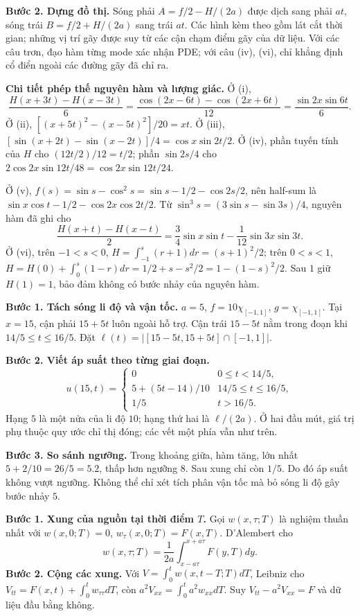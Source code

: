 \textbf{Bước 2. Dựng đồ thị.} Sóng phải $A=f/2-H/(2a)$ được dịch sang phải $at$, sóng trái $B=f/2+H/(2a)$ sang trái $at$. Các hình kèm theo gồm lát cắt thời gian; những vị trí gãy được suy từ các cận chạm điểm gãy của dữ liệu. Với các câu trơn, đạo hàm từng mode xác nhận PDE; với câu (iv), (vi), chỉ khẳng định cổ điển ngoài các đường gãy đã chỉ ra.

\textbf{Chi tiết phép thế nguyên hàm và lượng giác.} Ở (i),
\[\frac{H(x+3t)-H(x-3t)}6
=\frac{\cos(2x-6t)-\cos(2x+6t)}{12}
=\frac{\sin2x\sin6t}{6}.\]
Ở (ii), $[(x+5t)^2-(x-5t)^2]/20=xt$. Ở (iii), $[\sin(x+2t)-\sin(x-2t)]/4=\cos x\sin2t/2$. Ở (iv), phần tuyến tính của $H$ cho $(12t/2)/12=t/2$; phần $\sin2s/4$ cho $2\cos2x\sin12t/48=\cos2x\sin12t/24$.

Ở (v), $f(s)=\sin s-\cos^2s=\sin s-1/2-\cos2s/2$, nên half-sum là $\sin x\cos t-1/2-\cos2x\cos2t/2$. Từ $\sin^3s=(3\sin s-\sin3s)/4$, nguyên hàm đã ghi cho
\[\frac{H(x+t)-H(x-t)}2=\frac34\sin x\sin t-\frac1{12}\sin3x\sin3t.\]
Ở (vi), trên $-1<s<0$, $H=\int_{-1}^s(r+1)dr=(s+1)^2/2$; trên $0<s<1$, $H=H(0)+\int_0^s(1-r)dr=1/2+s-s^2/2=1-(1-s)^2/2$. Sau $1$ giữ $H(1)=1$, bảo đảm không có bước nhảy của nguyên hàm.

\textbf{Bước 1. Tách sóng li độ và vận tốc.} $a=5$, $f=10\chi_{[-1,1]}$, $g=\chi_{[-1,1]}$. Tại $x=15$, cận phải $15+5t$ luôn ngoài hỗ trợ. Cận trái $15-5t$ nằm trong đoạn khi $14/5\le t\le16/5$. Đặt $\ell(t)=|[15-5t,15+5t]\cap[-1,1]|$.

\textbf{Bước 2. Viết áp suất theo từng giai đoạn.}
\[u(15,t)=\begin{cases}0&0\le t<14/5,\\5+(5t-14)/10&14/5\le t\le16/5,\\1/5&t>16/5.\end{cases}\]
Hạng $5$ là một nửa của li độ $10$; hạng thứ hai là $\ell/(2a)$. Ở hai đầu mút, giá trị phụ thuộc quy ước chỉ thị đóng; các vết một phía vẫn như trên.

\textbf{Bước 3. So sánh ngưỡng.} Trong khoảng giữa, hàm tăng, lớn nhất $5+2/10=26/5=5.2$, thấp hơn ngưỡng $8$. Sau xung chỉ còn $1/5$. Do đó áp suất không vượt ngưỡng. Không thể chỉ xét tích phân vận tốc mà bỏ sóng li độ gây bước nhảy $5$.

\textbf{Bước 1. Xung của nguồn tại thời điểm $T$.} Gọi $w(x,\tau;T)$ là nghiệm thuần nhất với $w(x,0;T)=0$, $w_\tau(x,0;T)=F(x,T)$. D'Alembert cho
\[w(x,\tau;T)=\frac1{2a}\int_{x-a\tau}^{x+a\tau}F(y,T)dy.\]
\textbf{Bước 2. Cộng các xung.} Với $V=\int_0^t w(x,t-T;T)dT$, Leibniz cho $V_{tt}=F(x,t)+\int_0^t w_{\tau\tau}dT$, còn $a^2V_{xx}=\int_0^ta^2w_{xx}dT$. Suy $V_{tt}-a^2V_{xx}=F$ và dữ liệu đầu bằng không.

